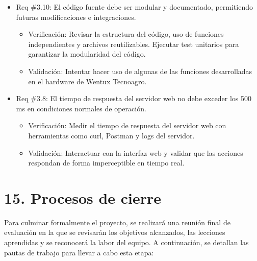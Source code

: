 \documentclass[
11pt, %
]{charter}
\begin{document}
\begin{itemize}
\item Req \#3.10: El código fuente debe ser modular y documentado, permitiendo futuras modificaciones e integraciones.
\begin{itemize}
	\item Verificación: Revisar la estructura del código, uso de funciones independientes y archivos reutilizables. Ejecutar test unitarios para garantizar la modularidad del código.
	\item Validación: Intentar hacer uso de algunas de las funciones desarrolladas en el hardware de Wentux Tecnoagro. 
\end{itemize}


\item Req \#3.8: El tiempo de respuesta del servidor web no debe exceder los 500 ms en condiciones normales de operación.
\begin{itemize}
	\item Verificación: Medir el tiempo de respuesta del servidor web con herramientas como curl, Postman y logs del servidor.
	\item Validación: Interactuar con la interfaz web y validar que las acciones respondan de forma imperceptible en tiempo real.
\end{itemize}

\end{itemize}


\section{15. Procesos de cierre}    
\label{sec:cierre}

Para culminar formalmente el proyecto, se realizará una reunión final de evaluación en la que se revisarán los objetivos alcanzados, las lecciones aprendidas y se reconocerá la labor del equipo. A continuación, se detallan las pautas de trabajo para llevar a cabo esta etapa:
\end{document}
